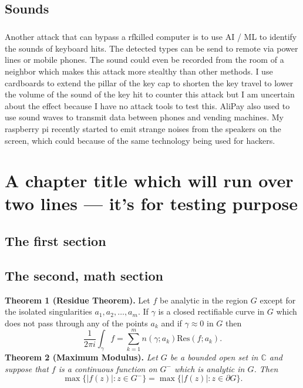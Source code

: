\documentclass[mscthesis]{usiinfthesis}
\begin{document}
\section{Sounds}

\paragraph{}
Another attack that can bypass a rfkilled computer is to use AI / ML to identify the sounds of keyboard hits. The detected types can be send to remote via power lines or mobile phones. The sound could even be recorded from the room of a neighbor which makes this attack more stealthy than other methods. I use cardboards to extend the pillar of the key cap to shorten the key travel to lower the volume of the sound of the key hit to counter this attack but I am uncertain about the effect because I have no attack tools to test this. AliPay also used to use sound waves to transmit data between phones and vending machines. My raspberry pi recently started to emit strange noises from the speakers on the screen, which could because of the same technology being used for hackers.

\chapter[Short title]{A chapter title which will run over two lines --- it's for
  testing purpose}

\section{The first section}

\section{The second, math section}

\textbf{Theorem 1 (Residue Theorem).}
Let $f$ be analytic in the region $G$ except for the isolated singularities $a_1,a_2,\ldots,a_m$. If $\gamma$ is a closed rectifiable curve in $G$ which does not pass through any of the points $a_k$ and if $\gamma\approx 0$ in $G$ then
\[
  \frac{1}{2\pi i}\int_\gamma f = \sum_{k=1}^m n(\gamma;a_k) \text{Res}(f;a_k).
\]
\textbf{Theorem 2 (Maximum Modulus).}
\emph{Let $G$ be a bounded open set in $\mathbb{C}$ and suppose that $f$ is a continuous function on $G^-$ which is analytic in $G$. Then}
\[
  \max\{|f(z)|:z\in G^-\}=\max \{|f(z)|:z\in \partial G \}.
\]
\end{document}
